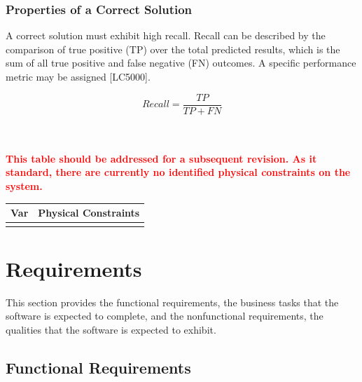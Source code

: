 \documentclass[12pt]{article}
\begin{document}
\subsubsection{Properties of a Correct Solution} \label{sec_CorrectSolution}

\noindent
A correct solution must exhibit high recall. Recall can be described by the comparison of true positive (TP) over the 
total predicted results, which is the sum of all true positive and false negative (FN) outcomes. A specific performance metric 
may be assigned [LC5000].

$$Recall = \frac{TP}{TP + FN}$$



\noindent
\\
\\
\textcolor{red}{\textbf{This table should be addressed for a subsequent revision. As it standard, there are currently no 
identified physical constraints on the system.}}
\begin{table}[!h]
\caption{Output Variables} \label{TblOutputVar}
\renewcommand{\arraystretch}{1.2}
\noindent \begin{longtable*}{l l} 
  \toprule
  \textbf{Var} & \textbf{Physical Constraints} \\
  \midrule 

  \\
  \bottomrule
\end{longtable*}
\end{table}

\section{Requirements}
This section provides the functional requirements, the business tasks that the
software is expected to complete, and the nonfunctional requirements, the
qualities that the software is expected to exhibit.

\newpage
\subsection{Functional Requirements}
\end{document}
